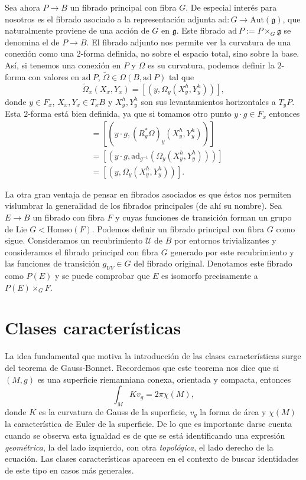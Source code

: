 \documentclass[12pt,a4paper]{article}
\theoremstyle{definition} \newtheorem{defn}[thm]{Definición}
\theoremstyle{definition} \newtheorem{ejemplo}[thm]{Ejemplo}
\theoremstyle{definition} \newtheorem{ejercicio}[thm]{Ejercicio}
\theoremstyle{remark} \newtheorem*{obs}{Observación}
\def\gg{\mathfrak{g}}
\def\ad{\mathrm{ad}}
\let\emph\relax
\begin{document}
      Sea ahora $P\rightarrow B$ un fibrado principal con fibra $G$. De especial interés para nosotros es el fibrado asociado a la representación adjunta $\ad:G\rightarrow \mathrm{Aut}(\gg)$, que naturalmente proviene de una acción de $G$ en $\gg$. Este fibrado $\ad\ P:=P\times_G \gg$ se denomina el \emph{fibrado adjunto} de $P\rightarrow B$. El fibrado adjunto nos permite ver la curvatura de una conexión como una $2$-forma definida, no sobre el espacio total, sino sobre la base. Así, si tenemos una conexión en $P$ y $\Omega$ es su curvatura, podemos definir la $2$-forma con valores en $\ad\ P$, $\tilde{\Omega}\in \Omega(B,\ad\ P)$ tal que
      \begin{equation*}
	\tilde{\Omega}_x(X_x,Y_x)=[(y,\Omega_y(X_y^h,Y_y^h))],
      \end{equation*}
      donde $y\in F_x$, $X_x,Y_x \in T_xB$ y $X_y^h,Y_y^h$ son sus levantamientos horizontales a $T_y P$. Esta $2$-forma está bien definida, ya que si tomamos otro punto $y\cdot g \in F_x$ entonces
      \begin{align*}
	[(y\cdot g,\Omega_{y\cdot g}(X^h_{y\cdot g},Y^h_{y\cdot g})]&=[(y\cdot g, (R^*_g\Omega)_y(X^h_y,Y^h_y))]\\ &=[(y\cdot g,\ad_{g^{-1}}(\Omega_y(X_y^h,Y_y^h)))]\\&=[(y,\Omega_y(X^h_y,Y^h_y))].
      \end{align*}

      La otra gran ventaja de pensar en fibrados asociados es que éstos nos permiten vislumbrar la generalidad de los fibrados principales (de ahí su nombre). Sea $E\rightarrow B$ un fibrado con fibra $F$ y cuyas funciones de transición forman un grupo de Lie $G<\mathrm{Homeo}(F)$. Podemos definir un fibrado principal con fibra $G$ como sigue. Consideramos un recubrimiento $\mathcal{U}$ de $B$ por entornos trivializantes y consideramos el fibrado principal con fibra $G$ generado por este recubrimiento y las funciones de transición $g_{UV}\in G$ del fibrado original. Denotamos este fibrado como $P(E)$ y se puede comprobar que $E$ es isomorfo precisamente a $P(E)\times_G F$.

	\section{Clases características}
	La idea fundamental que motiva la introducción de las clases características surge del teorema de Gauss-Bonnet. Recordemos que este teorema nos dice que si $(M,g)$ es una superficie riemanniana conexa, orientada y compacta, entonces
	\begin{equation*}
	  \int_M K v_g = 2\pi \chi(M),
	\end{equation*}
	donde $K$ es la curvatura de Gauss de la superficie, $v_g$ la forma de área y $\chi(M)$ la característica de Euler de la superficie. De lo que es importante darse cuenta cuando se observa esta igualdad es de que se está identificando una expresión \textit{geométrica}, la del lado izquierdo, con otra \textit{topológica}, el lado derecho de la ecuación. Las clases características aparecen en el contexto de buscar identidades de este tipo en casos más generales. 
\end{document}
